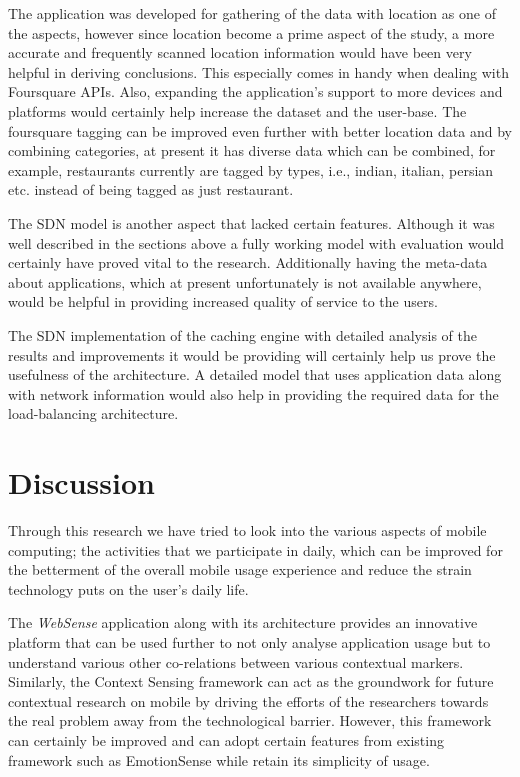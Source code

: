\documentclass[prodmode,acmtecs]{acmsmall}
\begin{document}
The application was developed for gathering of the data with location as one of the aspects, however since location become a prime aspect of the study, a more accurate and frequently scanned location information would have been very helpful in deriving conclusions. This especially comes in handy when dealing with Foursquare APIs. Also, expanding the application's support to more devices and platforms would certainly help increase the dataset and the user-base. The foursquare tagging can be improved even further with better location data and by combining categories, at present it has diverse data which can be combined, for example, restaurants currently are tagged by types, i.e., indian, italian, persian etc. instead of being tagged as just restaurant.

The SDN model is another aspect that lacked certain features. Although it was well described in the sections above a fully working model with evaluation would certainly have proved vital to the research. Additionally having the meta-data about applications, which at present unfortunately is not available anywhere, would be helpful in providing increased quality of service to the users.

The SDN implementation of the caching engine with detailed analysis of the results and improvements it would be providing will certainly help us prove the usefulness of the architecture. A detailed model that uses application data along with network information would also help in providing the required data for the load-balancing architecture.

\section{Discussion}

Through this research we have tried to look into the various aspects of mobile computing; the activities that we participate in daily, which can be improved for the betterment of the overall mobile usage experience and reduce the strain technology puts on the user's daily life. 

The \textit{WebSense} application along with its architecture provides an innovative platform that can be used further to not only analyse application usage but to understand various other co-relations between various contextual markers. Similarly, the Context Sensing framework can act as the groundwork for future contextual research on mobile by driving the efforts of the researchers towards the real problem away from the technological barrier. However, this framework can certainly be improved and can adopt certain features from existing framework such as EmotionSense \cite{rachuri2010emotionsense} while retain its simplicity of usage.
\end{document}

